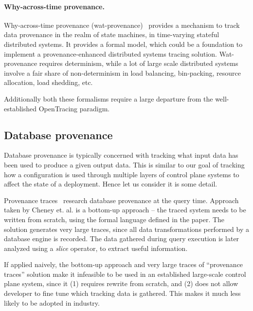\paragraph*{Why-across-time provenance.} Why-across-time provenance (wat-provenance)~\cite{whittaker2018debugging} provides a mechanism to track data provenance in the realm of state machines, in time-varying stateful distributed systems. It provides a formal model, which could be a foundation to implement a provenance-enhanced distributed systems tracing solution. Wat-provenance requires determinism, while a lot of large scale distributed systems involve a fair share of non-determinism in load balancing, bin-packing, resource allocation, load shedding, etc.

Additionally both 
these formalisms require a large departure from the well-established OpenTracing paradigm.

\subsection{Database provenance}

Database provenance is typically concerned with tracking what input data has been used to produce a given output data. This is similar to our goal of tracking how a configuration is used through multiple layers of control plane systems to affect the state of a deployment. Hence let us consider it is some detail.

Provenance traces~\cite{cheney2008provenance} research database provenance at the query time. Approach taken by Cheney et. al. is a bottom-up approach -- the traced system needs to be written from scratch, using the formal language defined in the paper. The solution generates very large traces, since all data transformations performed by a database engine is recorded. The data gathered during query execution is later analyzed using a \textit{slice}  operator, to extract useful information. 

If applied naively, the bottom-up approach and very large traces of ``provenance traces'' solution make it infeasible to be used in an established large-scale control plane system, since it (1) requires rewrite from scratch, and (2) does not allow developer to fine tune which tracking data is gathered. This makes it much less likely to be adopted in industry.


